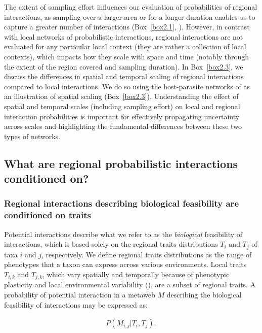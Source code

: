 The extent of sampling effort influences our evaluation of probabilities of
regional interactions, as sampling over a larger area or for a longer duration
enables us to capture a greater number of interactions (Box~\ref{box2.1},
\cite{McLeod2021Sampling}). However, in contrast with local networks of
probabilistic interactions, regional interactions are not evaluated for any
particular local context (they are rather a collection of local contexts), which
impacts how they scale with space and time (notably through the extent of the
region covered and sampling duration). In Box~\ref{box2.3}, we discuss the
differences in spatial and temporal scaling of regional interactions compared to
local interactions. We do so using the host-parasite networks of
\textcite{Kopelke2017Foodweb} as an illustration of spatial scaling
(Box~\ref{box2.3}). Understanding the effect of spatial and temporal scales
(including sampling effort) on local and regional interaction probabilities is
important for effectively propagating uncertainty across scales and highlighting
the fundamental differences between these two types of networks. 

\subsection{What are regional probabilistic interactions conditioned on?}

\subsubsection{Regional interactions describing biological feasibility are conditioned on traits}

Potential interactions describe what we refer to as the \textit{biological}
feasibility of interactions, which is based solely on the regional traits
distributions $T_i$ and $T_j$ of taxa $i$ and $j$, respectively. We define
regional traits distributions as the range of phenotypes that a taxon can
express across various environments. Local traits $T_{i,k}$ and $T_{j,k}$, which
vary spatially and temporally because of phenotypic plasticity and local
environmental variability (\cite{Berg2010Trait}), are a subset of regional
traits. A probability of potential interaction in a metaweb $M$ describing the
biological feasibility of interactions may be expressed as: 

\begin{eqnarray}
  \label{eq:metaweb}
  P(M_{i, j} | T_i, T_j),
\end{eqnarray}

